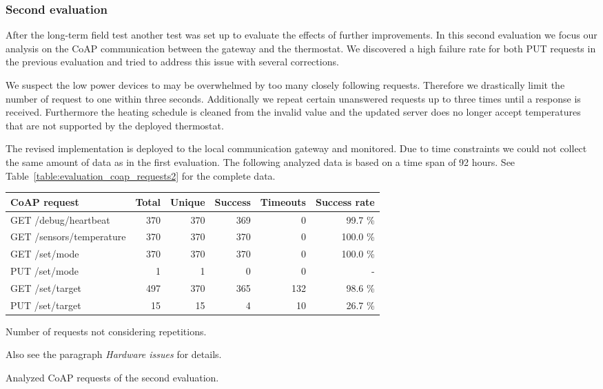 
\subsubsection{Second evaluation}

After the long-term field test another test was set up to evaluate the effects of further improvements.
In this second evaluation we focus our analysis on the CoAP communication between the gateway and the thermostat.
We discovered a high failure rate for both PUT requests in the previous evaluation and tried to address this issue with several corrections.

We suspect the low power devices to may be overwhelmed by too many closely following requests.
Therefore we drastically limit the number of request to one within three seconds.
Additionally we repeat certain unanswered requests up to three times until a response is received.
Furthermore the heating schedule is cleaned from the invalid value and the updated server does no longer accept temperatures that are not supported by the deployed thermostat.

The revised implementation is deployed to the local communication gateway and monitored.
Due to time constraints we could not collect the same amount of data as in the first evaluation.
The following analyzed data is based on a time span of 92 hours.
See Table~\ref{table:evaluation_coap_requests2} for the complete data.

\begin{threeparttable}[htbp]
	\centering
	\begin{tabular}{ l | r r r r r }
		\toprule
		CoAP request	& Total	& Unique\tnote{\textdagger}	& Success	& Timeouts	& Success rate \\
		\midrule
		GET /debug/heartbeat	& 370	& 370	& 369	& 0	& 99.7 \% \\
		GET /sensors/temperature	& 370	& 370	& 370	& 0	& 100.0 \% \\
		GET /set/mode	& 370	& 370	& 370	& 0	& 100.0 \% \\
		PUT /set/mode	& 1	& 1	& 0	& 0	& - \\
		GET /set/target	& 497	& 370	& 365	& 132	& 98.6 \% \\
		PUT /set/target	\tnote{\textasteriskcentered} & 15	& 15	& 4	& 10	& 26.7 \% \\
		\bottomrule
	\end{tabular}
	\begin{tablenotes}
		\footnotesize{
			\item[\textdagger] Number of requests not considering repetitions.
			\item[\textasteriskcentered] Also see the paragraph \emph{Hardware issues} for details.
		}
	\end{tablenotes}
	\caption{Analyzed CoAP requests of the second evaluation.}
	\label{table:evaluation_coap_requests2}
\end{threeparttable}

